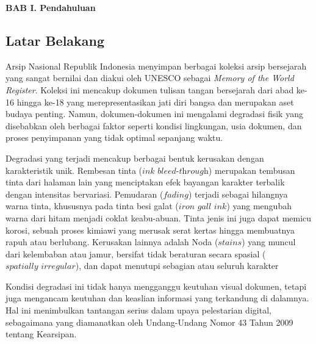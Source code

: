 \documentclass[12pt,a4paper]{article}
\begin{document}

\vspace{2cm}
\begin{center}
{\fontsize{14}{16.8}\selectfont\textbf{BAB I. Pendahuluan}}\\[1em]
\end{center}
\label{sec:pendahuluan}
\setcounter{section}{1}
\setcounter{subsection}{0}
\vspace{2em}
\subsection{Latar Belakang}
\label{subsec:latar-belakang}
\vspace{0.8em}
Arsip Nasional Republik Indonesia menyimpan berbagai koleksi arsip bersejarah yang sangat bernilai dan diakui oleh UNESCO sebagai \textit{Memory of the World Register}. Koleksi ini mencakup dokumen tulisan tangan bersejarah dari abad ke-16 hingga ke-18 yang merepresentasikan jati diri bangsa dan merupakan aset budaya penting. Namun, dokumen-dokumen ini mengalami degradasi fisik yang disebabkan oleh berbagai faktor seperti kondisi lingkungan, usia dokumen, dan proses penyimpanan yang tidak optimal sepanjang waktu.


\vspace{0.8em}
Degradasi yang terjadi mencakup berbagai bentuk kerusakan dengan karakteristik unik. Rembesan tinta ($\textit{ink bleed-through}$) merupakan tembusan tinta dari halaman lain yang menciptakan efek bayangan karakter terbalik dengan intensitas bervariasi. Pemudaran ($\textit{fading}$) terjadi sebagai hilangnya warna tinta, khususnya pada tinta besi galat ($\textit{iron gall ink}$) yang mengubah warna dari hitam menjadi coklat keabu-abuan. Tinta jenis ini juga dapat memicu korosi, sebuah proses kimiawi yang merusak serat kertas hingga membuatnya rapuh atau berlubang. Kerusakan lainnya adalah Noda ($\textit{stains}$) yang muncul dari kelembaban atau jamur, bersifat tidak beraturan secara spasial ($\textit{spatially irregular}$),  dan dapat menutupi sebagian atau seluruh karakter

\vspace{0.8em}
Kondisi degradasi ini tidak hanya mengganggu keutuhan visual dokumen, tetapi juga mengancam keutuhan dan keaslian informasi yang terkandung di dalamnya. Hal ini menimbulkan tantangan serius dalam upaya pelestarian digital, sebagaimana yang diamanatkan oleh Undang-Undang Nomor 43 Tahun 2009 tentang Kearsipan.
\end{document}

